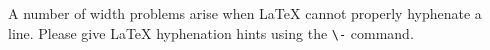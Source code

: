 \documentclass{article}
\begin{document}
A number of width problems arise when LaTeX cannot properly hyphenate a
line. Please give LaTeX hyphenation hints using the \verb+\-+ command.




%



\end{document}
